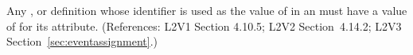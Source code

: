 Any \Compartment, \Species or \Parameter definition whose identifier is
used as the value of  in an \EventAssignment must have a
value of  for its  attribute.  (References: 
L2V1 Section 4.10.5; L2V2 Section~4.14.2; L2V3 Section~\ref{sec:eventassignment}.)
